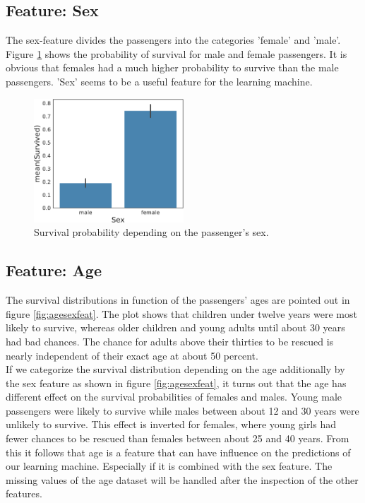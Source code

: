\subsection{Feature: Sex}
The sex-feature divides the passengers into the categories 'female' and 'male'. Figure \ref{fig:sexfeat} shows the probability of survival for male and female passengers. It is obvious that females had a much higher probability to survive than the male passengers. 'Sex' seems to be a useful feature for the learning machine.
 \begin{figure}
 	\centering
    \includegraphics[width=0.5\textwidth]{media_saved/sex_survived}
  \caption{Survival probability depending on the passenger's sex.}
  \label{fig:sexfeat}
 \end{figure}

\subsection{Feature: Age}
The survival distributions in function of the passengers' ages are pointed out in figure \ref{fig:agesexfeat}. The plot shows that children under twelve years were most likely to survive, whereas older children and young adults until about 30 years had bad chances. The chance for adults above their thirties to be rescued is nearly independent of their exact age at about 50 percent.\\ If we categorize the survival distribution depending on the age additionally by the sex feature as shown in figure \ref{fig:agesexfeat}, it turns out that the age has different effect on the survival probabilities of females and males. Young male passengers were likely to survive while males between about 12 and 30 years were unlikely to survive. This effect is inverted for females, where young girls had fewer chances to be rescued than females between about 25 and 40 years. From this it follows that age is a feature that can have influence on the predictions of our learning machine. Especially if it is combined with the sex feature. The missing values of the age dataset will be handled after the inspection of the other features.

